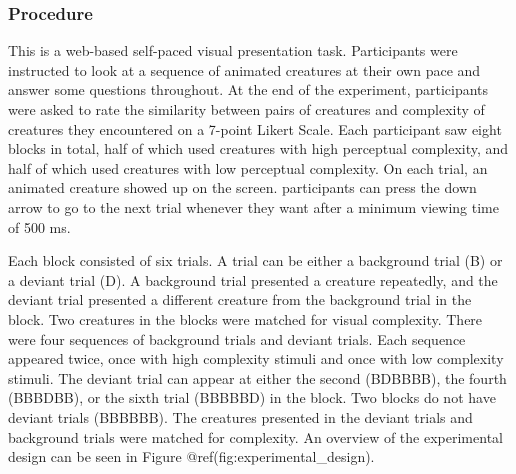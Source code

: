 \documentclass[10pt, letterpaper]{article}
\begin{document}
\hypertarget{procedure}{%
\subsubsection{Procedure}\label{procedure}}

This is a web-based self-paced visual presentation task. Participants
were instructed to look at a sequence of animated creatures at their own
pace and answer some questions throughout. At the end of the experiment,
participants were asked to rate the similarity between pairs of
creatures and complexity of creatures they encountered on a 7-point
Likert Scale. Each participant saw eight blocks in total, half of which
used creatures with high perceptual complexity, and half of which used
creatures with low perceptual complexity. On each trial, an animated
creature showed up on the screen. participants can press the down arrow
to go to the next trial whenever they want after a minimum viewing time
of 500 ms.

Each block consisted of six trials. A trial can be either a background
trial (B) or a deviant trial (D). A background trial presented a
creature repeatedly, and the deviant trial presented a different
creature from the background trial in the block. Two creatures in the
blocks were matched for visual complexity. There were four sequences of
background trials and deviant trials. Each sequence appeared twice, once
with high complexity stimuli and once with low complexity stimuli. The
deviant trial can appear at either the second (BDBBBB), the fourth
(BBBDBB), or the sixth trial (BBBBBD) in the block. Two blocks do not
have deviant trials (BBBBBB). The creatures presented in the deviant
trials and background trials were matched for complexity. An overview of
the experimental design can be seen in Figure
@ref(fig:experimental\_design).
\end{document}
